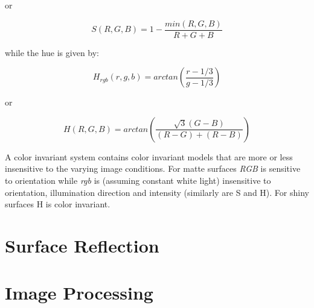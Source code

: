 \documentclass[a4paper,twocolumn]{article}
\begin{document}
or

\begin{equation}
S(R, G, B) = 1 - \frac{min(R, G, B)}{R + G + B}
\end{equation}

while the hue is given by:

\begin{equation}
H_{rgb}(r, g, b) = arctan(\frac{r - 1/3}{g - 1/3})
\end{equation}

or

\begin{equation}
H(R, G, B) = arctan(\frac{\sqrt{3}(G - B)}{(R - G) + (R - B)})
\end{equation}

A color invariant system contains color invariant models that are more or less
insensitive to the varying image conditions. For matte surfaces
\textit{RGB} is sensitive to orientation while \textit{rgb} is (assuming
constant white light) insensitive to orientation, illumination direction and
intensity (similarly are S and H). For shiny surfaces H is color invariant.


\section{Surface Reflection}



\section{Image Processing}
\end{document}
